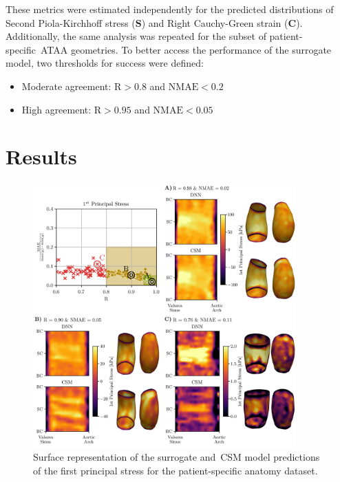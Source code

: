\documentclass[a4paper,fleqn]{cas-sc}
\begin{document}
    These metrics were estimated independently for the predicted distributions of Second Piola-Kirchhoff stress ($\boldsymbol{S}$) and Right Cauchy-Green strain ($\boldsymbol{C}$). Additionally, the same analysis was repeated for the subset of patient-specific~\gls{ATAA} geometries. To better access the performance of the surrogate model, two thresholds for success were defined:
    \begin{itemize}
        \item Moderate agreement: $\mathrm{R} > 0.8$ and $\mathrm{NMAE} < 0.2$
        \item High agreement: $\mathrm{R} > 0.95$ and $\mathrm{NMAE} < 0.05$
    \end{itemize}

\section{Results} \label{sec:results}
\begin{figure}
  \centering
  \includegraphics[width=0.9\textwidth]{fig6}
  \caption{Surface representation of the surrogate and~\gls{CSM} model predictions of the first principal stress for the patient-specific anatomy dataset.}
  \label{fig:surface_representationPSStress}
\end{figure}
\end{document}
